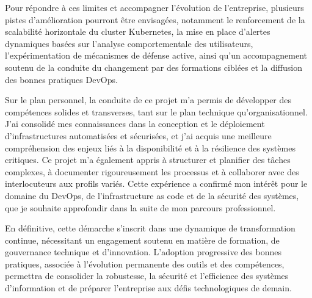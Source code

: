 Pour répondre à ces limites et accompagner l’évolution de l’entreprise, plusieurs pistes d’amélioration pourront être envisagées, notamment le renforcement de la scalabilité horizontale du cluster Kubernetes, la mise en place d’alertes dynamiques basées sur l’analyse comportementale des utilisateurs, l’expérimentation de mécanismes de défense active, ainsi qu’un accompagnement soutenu de la conduite du changement par des formations ciblées et la diffusion des bonnes pratiques DevOps.

Sur le plan personnel, la conduite de ce projet m’a permis de développer des compétences solides et transverses, tant sur le plan technique qu’organisationnel. J’ai consolidé mes connaissances dans la conception et le déploiement d’infrastructures automatisées et sécurisées, et j’ai acquis une meilleure compréhension des enjeux liés à la disponibilité et à la résilience des systèmes critiques. Ce projet m’a également appris à structurer et planifier des tâches complexes, à documenter rigoureusement les processus et à collaborer avec des interlocuteurs aux profils variés. Cette expérience a confirmé mon intérêt pour le domaine du DevOps, de l’infrastructure as code et de la sécurité des systèmes, que je souhaite approfondir dans la suite de mon parcours professionnel.

En définitive, cette démarche s’inscrit dans une dynamique de transformation continue, nécessitant un engagement soutenu en matière de formation, de gouvernance technique et d’innovation. L’adoption progressive des bonnes pratiques, associée à l’évolution permanente des outils et des compétences, permettra de consolider la robustesse, la sécurité et l’efficience des systèmes d’information et de préparer l’entreprise aux défis technologiques de demain.